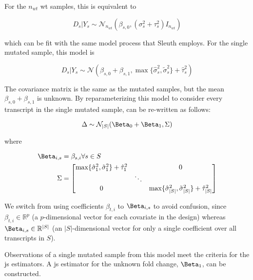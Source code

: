 For the $n_{wt}$ \gls{wt} samples, this is equivalent to

\begin{equation*}
  D_s | Y_s \sim \mathcal{N}_{n_{wt}} \left( \beta_{s,0}, (\sigma_s^2 + \tau_s^2)I_{n_{wt}} \right)
\end{equation*}

which can be fit with the same model process that Sleuth employs.
For the single mutated sample, this model is

\begin{equation}
  D_s | Y_s \sim \mathcal{N} \left( \beta_{s, 0} + \beta_{s, 1}, \max\{ \hat{\sigma}_s^2, \tilde{\sigma}_s^2 \} + \hat{\tau}_s^2 \right)
  \label{eqn:single_mut_model}
\end{equation}

The covariance matrix is the same as the mutated samples, but the mean $\beta_{s, 0} + \beta_{s, 1}$ is unknown.
By reparameterizing this model to consider every transcript in the single mutated sample,  can be re-written as follows:

\begin{equation}
  \Delta \sim \mathcal{N}_{|S|}(\Beta_0 + \Beta_1, \Sigma) \\
\end{equation}

where

\begin{align*}
  \Beta_{i,s} &= \beta_{s,i} \forall s \in S \\
  \Sigma &= \begin{bmatrix}
    \max\{ \hat{\sigma}_1^2, \tilde{\sigma}_1^2 \} + \hat{\tau}_1^2 & & 0 \\
    & \ddots & \\
    0 & & \max\{ \hat{\sigma}_{|S|}^2, \tilde{\sigma}_{|S|}^2 \} + \hat{\tau}_{|S|}^2 \\
  \end{bmatrix}
\end{align*}

We switch from using coefficients $\beta_{t,i}$ to $\Beta_{i,s}$ to avoid confusion, since $\beta_{t,i} \in \mathbb{R}^p$ (a $p$-dimensional vector for each covariate in the design) whereas $\Beta_{i,s} \in \mathbb{R}^{|S|}$ (an $|S|$-dimensional vector for only a single coefficient over all transcripts in $S$).

Observations of a single mutated sample from this model meet the criteria for the \gls{js} estimators.
A \gls{js} estimator for the unknown fold change, $\Beta_1$, can be constructed.

